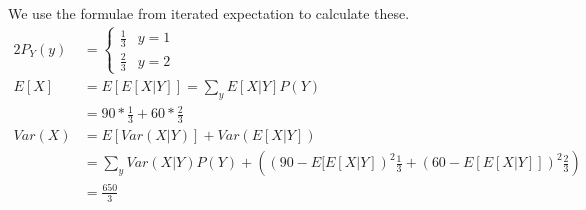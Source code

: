 \documentclass[../../probability-notes.tex]{subfile}
\begin{document}
        We use the formulae from iterated expectation to calculate these.
        \begin{alignat*}{2}
            P_{Y}(y) &= \begin{cases} \frac{1}{3} &y = 1\\
                                    \frac{2}{3} &y = 2 \end{cases}\\
            E[X] &= E[E[X|Y]] = \sum_{y}E[X|Y]P(Y)\\
                &= 90 * \frac{1}{3} + 60 * \frac{2}{3}\\
            Var(X) &= E[Var(X|Y)] + Var(E[X|Y])\\
                  &= \sum_{y}Var(X|Y)P(Y) + ((90-E[E[X|Y])^{2}\frac{1}{3} + (60-E[E[X|Y]])^{2}\frac{2}{3})\\
                  &= \frac{650}{3}
        \end{alignat*}
\end{document}
